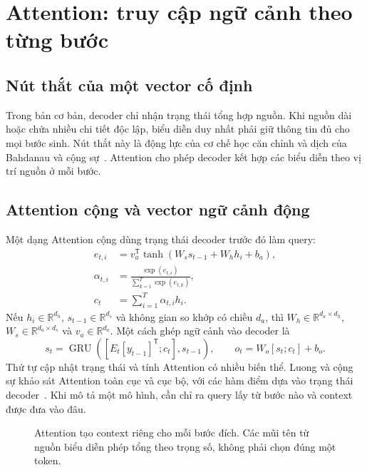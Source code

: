 \documentclass[11pt,a4paper]{article}
\numberwithin{equation}{section}
\newcommand{\R}{\mathbb{R}}
\begin{document}
\section{Attention: truy cập ngữ cảnh theo từng bước}
\subsection{Nút thắt của một vector cố định}
Trong bản cơ bản, decoder chỉ nhận trạng thái tổng hợp nguồn. Khi nguồn dài hoặc chứa nhiều chi tiết độc lập, biểu diễn duy nhất phải giữ thông tin đủ cho mọi bước sinh. Nút thắt này là động lực của cơ chế học căn chỉnh và dịch của Bahdanau và cộng sự~\cite{bahdanau}. Attention cho phép decoder kết hợp các biểu diễn theo vị trí nguồn ở mỗi bước.

\subsection{Attention cộng và vector ngữ cảnh động}
Một dạng Attention cộng dùng trạng thái decoder trước đó làm query:
\begin{align}
e_{t,i}&=v_a^{\mathsf T}\tanh(W_ss_{t-1}+W_hh_i+b_a),\\
\alpha_{t,i}&=\frac{\exp(e_{t,i})}{\sum_{k=1}^{T}\exp(e_{t,k})},\\
c_t&=\sum_{i=1}^{T}\alpha_{t,i}h_i.
\end{align}
Nếu $h_i\in\R^{d_h}$, $s_{t-1}\in\R^{d_s}$ và không gian so khớp có chiều $d_a$, thì $W_h\in\R^{d_a\times d_h}$, $W_s\in\R^{d_a\times d_s}$ và $v_a\in\R^{d_a}$. Một cách ghép ngữ cảnh vào decoder là
\begin{equation}
s_t=\operatorname{GRU}([E_t[y_{t-1}]^{\mathsf T};c_t],s_{t-1}),
\qquad o_t=W_o[s_t;c_t]+b_o.
\end{equation}
Thứ tự cập nhật trạng thái và tính Attention có nhiều biến thể. Luong và cộng sự khảo sát Attention toàn cục và cục bộ, với các hàm điểm dựa vào trạng thái decoder~\cite{luong}. Khi mô tả một mô hình, cần chỉ ra query lấy từ bước nào và context được đưa vào đâu.

\begin{figure}[H]
\centering
{}
\caption{Attention tạo context riêng cho mỗi bước đích. Các mũi tên từ nguồn biểu diễn phép tổng theo trọng số, không phải chọn đúng một token.}
\end{figure}
\end{document}
